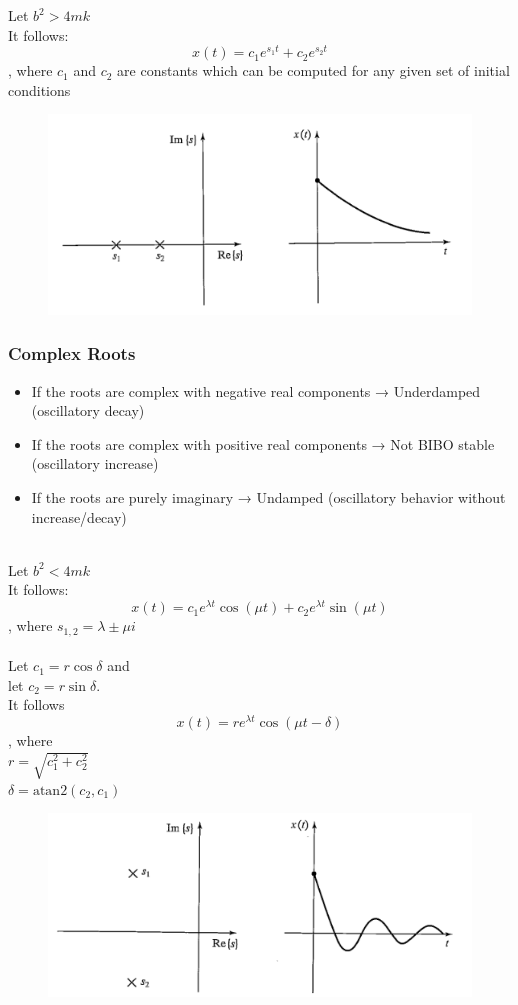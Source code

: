 \documentclass[10pt,a4paper]{article}
\newcommand{\atan}{\ensuremath{\mathrm{atan2 }}}
\begin{document}
Let $b^2 > 4mk$ \\
It follows:
$$
	x(t) = c_1e^{s_1t} + c_2e^{s_2t}
$$
, where $c_1$ and $c_2$ are constants which can be computed for any given set of initial conditions

\begin{figure}[H]
	\includegraphics[width=0.5\columnwidth]{imgs/dgl_re_uneq.png}
\end{figure}

\subsubsection{Complex Roots}
\begin{itemize}
	\item If the roots are complex with negative real components → Underdamped (oscillatory decay)
	\item If the roots are complex with positive real components → Not BIBO stable (oscillatory increase)
	\item If the roots are purely imaginary → Undamped (oscillatory behavior without increase/decay)
\end{itemize}
~\\

Let $b^2 < 4mk$ \\
It follows:
$$
	x(t) = c_1e^{\lambda t}\cos(\mu t) + c_2e^{\lambda t} \sin(\mu t)
$$
, where $s_{1,2} = \lambda \pm \mu i$ \\
\\

Let $c_1 = r \cos \delta$ and \\
let $c_2 = r \sin \delta$. \\
It follows
$$
	x(t) = r e^{\lambda t} \cos(\mu t - \delta)
$$
, where \\
$r = \sqrt{c_1^2 + c_2^2}$ \\
$\delta = \atan(c_2, c_1)$

\begin{figure}[H]
	\includegraphics[width=0.5\columnwidth]{imgs/dgl_im.png}
\end{figure}
\end{document}
